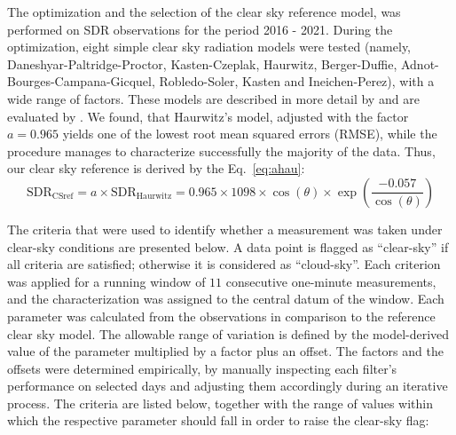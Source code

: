 \documentclass[applsci,article,submit,moreauthors,pdftex]{Definitions/mdpi}
\begin{document}
The optimization and the selection of the clear sky reference model, was
performed on SDR observations for the period 2016 - 2021. During the
optimization, eight simple clear sky radiation models were tested
(namely, Daneshyar-Paltridge-Proctor, Kasten-Czeplak, Haurwitz,
Berger-Duffie, Adnot-Bourges-Campana-Gicquel, Robledo-Soler, Kasten and
Ineichen-Perez), with a wide range of factors. These models are
described in more detail by \citet{Reno2012} and are evaluated by
\citet{Reno2016}. We found, that Haurwitz's model, adjusted with the
factor \(a = 0.965\) yields one of the lowest root mean squared errors
(RMSE), while the procedure manages to characterize successfully the
majority of the data. Thus, our clear sky reference is derived by the
Eq.~\ref{eq:ahau}: \begin{equation}
\text{SDR}_\text{CSref} = a \times \text{SDR}_\text{Haurwitz} = 0.965 \times 1098 \times \cos(\theta) \times \exp \left( \frac{ - 0.057}{\cos(\theta)} \right) \label{eq:ahau}
\end{equation}

The criteria that were used to identify whether a measurement was taken
under clear-sky conditions are presented below. A data point is flagged
as ``clear-sky'' if all criteria are satisfied; otherwise it is
considered as ``cloud-sky''. Each criterion was applied for a running
window of \(11\) consecutive one-minute measurements, and the
characterization was assigned to the central datum of the window. Each
parameter was calculated from the observations in comparison to the
reference clear sky model. The allowable range of variation is defined
by the model-derived value of the parameter multiplied by a factor plus
an offset. The factors and the offsets were determined empirically, by
manually inspecting each filter's performance on selected days and
adjusting them accordingly during an iterative process. The criteria are
listed below, together with the range of values within which the
respective parameter should fall in order to raise the clear-sky flag:
\end{document}
